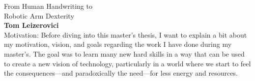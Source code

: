

\vfill  %

\begin{center}
    \begin{minipage}{\textwidth}
        \centering
        \Huge From Human Handwriting to\\ Robotic Arm Dexterity \\[1cm]
        \textbf{Tom Leizerovici} \\[1cm]
        Motivation: Before diving into this master's thesis, I want to explain a bit about my motivation, vision, and goals regarding the work I have done during my master's. The goal was to learn many new hard skills in a way that can be used to create a new vision of technology, particularly in a world where we start to feel the consequences—and paradoxically the need—for less energy and resources.
    \end{minipage}
\end{center}

\vfill  %

